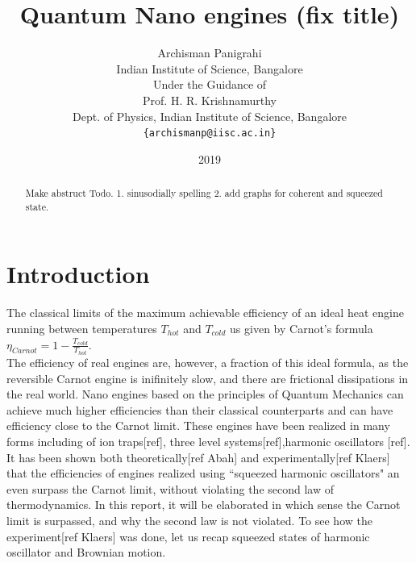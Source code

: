 \documentclass[12pt, twoside]{article}
\begin{document}
\setpagewiselinenumbers


\title{Quantum Nano engines (fix title)}

\date{2019}



\author{Archisman Panigrahi\\
	\footnotesize Indian Institute of Science, Bangalore\\
	\footnotesize Under the Guidance of\\
	Prof. H. R. Krishnamurthy\\
	\footnotesize Dept. of Physics, Indian Institute of Science, Bangalore
	\footnotesize \texttt{\{archismanp@iisc.ac.in\}} \\ }


\maketitle

\begin{abstract}

Make abstruct
Todo. 1. sinusodially spelling
2. add graphs for coherent and squeezed state.

\end{abstract}

\newpage\tableofcontents

\section{Introduction}
The classical limits of the maximum achievable efficiency of an ideal heat engine running between temperatures $T_{hot}$ and $T_{cold}$ us given by Carnot's formula $\eta_{Carnot} = 1 - \frac{T_{cold}}{T_{hot}}$.\\
The efficiency of real engines are, however, a fraction of this ideal formula, as the reversible Carnot engine is inifinitely slow, and there are frictional dissipations in the real world.
Nano engines based on the principles of Quantum Mechanics can achieve much higher efficiencies than their classical counterparts and can have efficiency close to the Carnot limit.
These engines have been realized in many forms including of ion traps[ref], three level systems[ref],harmonic oscillators [ref].
It has been shown both theoretically[ref Abah] and experimentally[ref Klaers] that the efficiencies of engines realized using ``squeezed harmonic oscillators" an even surpass the Carnot limit, without violating the second law of thermodynamics. In this report, it will be elaborated in which sense the Carnot limit is surpassed, and why the second law is not violated.
To see how the experiment[ref Klaers] was done, let us recap squeezed states of harmonic oscillator and Brownian motion.
\end{document}
